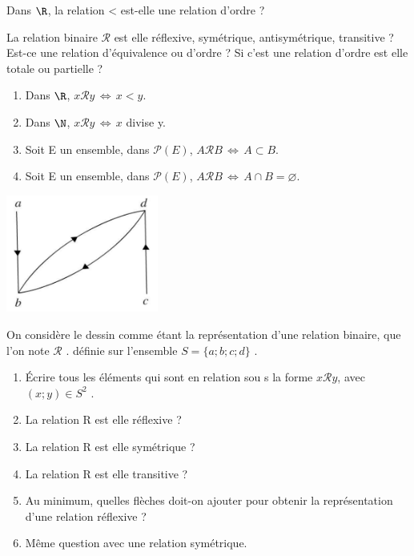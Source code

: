 \documentclass[a4paper,12pt,french]{book}
\let\emptyset\varnothing
\begin{document}
\begin{corrige}[Question]
	Dans $\R$, la relation < est-elle une relation d'ordre ?
\end{corrige}




\begin{exercice}[]
La relation binaire $\mathcal{R}$ est elle réflexive, symétrique, antisymétrique, transitive ? Est-ce une relation d'équivalence ou d'ordre ? Si c'est une relation d'ordre est elle totale ou partielle ?
\begin{enumerate}[\textbullet]
	\item 	Dans $\R$, $x\mathcal{R}y\,\Leftrightarrow\, x<y$.
	\item 	Dans $\N$, $x\mathcal{R}y\,\Leftrightarrow\,x$ divise y.
	\item 	Soit E un ensemble, dans $\mathcal{P}(E)$, $A\mathcal{R}B\,\Leftrightarrow\, A\subset B$.
	\item 	Soit E un ensemble, dans $\mathcal{P}(E)$, $A\mathcal{R}B\,\Leftrightarrow\, A\cap B=\emptyset$.\\
\end{enumerate}
\end{exercice}

\begin{exercice}[]
\begin{center}
	\includegraphics[width=5cm]{img/graphe.PNG}
\end{center}


On considère le dessin comme étant la représentation d'une relation binaire, que l'on note $\mathcal{R}$ . définie sur l'ensemble $S = \{ a;b;c;d\}$ .

\begin{enumerate}[\bfseries a.]
	\item 	Écrire tous les éléments qui sont en relation sou s la forme $x\mathcal{R}y$, avec $(x;y) \in S^2$ .
	\item 	La relation R est elle réflexive ?
	\item 	La relation R est elle symétrique ?
	\item 	La relation R est elle transitive ?
	\item 	Au minimum, quelles flèches doit-on ajouter pour obtenir la représentation d'une
	relation réflexive ?
	\item Même question avec une relation symétrique.
\end{enumerate}
\end{exercice}
\end{document}
